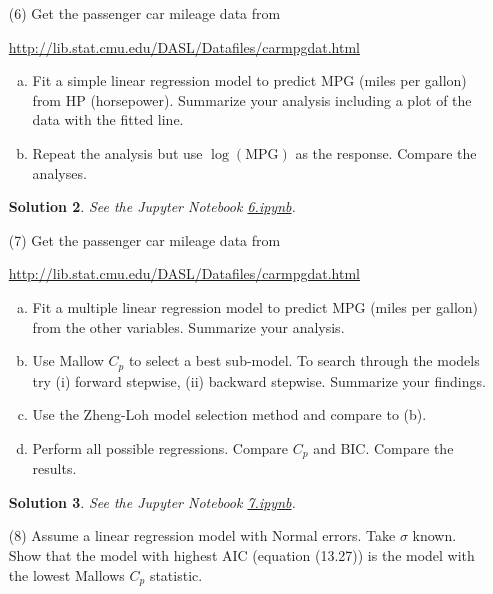 \documentclass[10pt]{article}
\newtheorem*{sol}{Solution}
\newcommand{\V}{\mathbb{V}}
\newcommand{\E}{\mathbb{E}}
\begin{document}
\begin{enumerate}
\begin{sol}
As long as $\sum X_i^2 \to \infty$ we have $\E(\hat \beta)\to \beta$ and
$\V(\hat \beta)\to 0$. Thus $\hat \beta$ converges to $\beta$ in quadratic mean
and therefore also in probability (see e.g. exercise 5.2).
\end{sol}

\item[(6)] Get the passenger car mileage data from

\href{http://lib.stat.cmu.edu/DASL/Datafiles/carmpgdat.html}
{http://lib.stat.cmu.edu/DASL/Datafiles/carmpgdat.html}
\begin{enumerate}[(a)]
\item Fit a simple linear regression model to predict MPG (miles per
gallon) from HP (horsepower). Summarize your analysis including a
plot of the data with the fitted line.
\item Repeat the analysis but use $\log(\text{MPG})$ as the response. Compare
the analyses.
\end{enumerate}

\begin{sol}
See the Jupyter Notebook
\href{https://github.com/ajrasmus/some_of_statistics/blob/main/chapter_13/6.ipynb}{6.ipynb}.
\end{sol}

\item[(7)] Get the passenger car mileage data from

\href{http://lib.stat.cmu.edu/DASL/Datafiles/carmpgdat.html}
{http://lib.stat.cmu.edu/DASL/Datafiles/carmpgdat.html}
\begin{enumerate}[(a)]
\item Fit a multiple linear regression model to predict MPG (miles per
gallon) from the other variables. Summarize your analysis.
\item Use Mallow $C_p$ to select a best sub-model. To search through the
models try (i) forward stepwise, (ii) backward stepwise. Summarize your
findings.
\item Use the Zheng-Loh model selection method and compare to (b).
\item Perform all possible regressions. Compare $C_p$ and BIC. Compare the
results.
\end{enumerate}

\begin{sol}
See the Jupyter Notebook
\href{https://github.com/ajrasmus/some_of_statistics/blob/main/chapter_13/7.ipynb}{7.ipynb}.
\end{sol}

\item[(8)] Assume a linear regression model with Normal errors. Take $\sigma$ known.
Show that the model with highest AIC (equation (13.27)) is the model
with the lowest Mallows $C_p$ statistic.


\end{enumerate}
\end{document}
